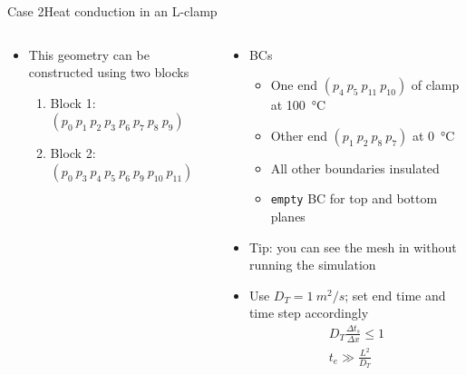 \begin{frame}{Case 2}{Heat conduction in an L-clamp}
\begin{columns}
\begin{column}{0.5\linewidth}
\begin{figure}
            \end{figure}
            \begin{itemize}
                \item This geometry can be constructed using two blocks
                \begin{enumerate}
                    \item Block 1: $(p_0 ~ p_1 ~ p_2 ~ p_3 ~ p_6 ~ p_7 ~ p_8 ~ p_9)$
                    \item Block 2: $(p_0 ~ p_3 ~ p_4 ~ p_5 ~ p_6 ~ p_9 ~ p_{10} ~ p_{11})$
                \end{enumerate}
            \end{itemize}
        \end{column}
        \begin{column}{0.5\linewidth}
            \begin{itemize}
                \item BCs
                \begin{itemize}
                    \item One end $(p_4 ~ p_5 ~ p_{11} ~ p_{10})$ of clamp at \qty{100}{\degreeCelsius}
                    \item Other end $(p_1 ~ p_2 ~ p_8 ~ p_7)$ at \qty{0}{\degreeCelsius}
                    \item All other boundaries insulated
                    \item \texttt{empty} BC for top and bottom planes
                \end{itemize}
	            \item Tip: you can see the mesh in \paraview{} without running the simulation
                \item Use $D_T=\qty{1}{m^2/s}$; set end time and time step accordingly
                \begin{gather*}
                    D_T \frac{\Delta t_s}{\Delta x} \le 1\\
                    t_e \gg \frac{L^2}{D_T}
                \end{gather*}
            \end{itemize}
        \end{column}
    \end{columns}
\end{frame}

